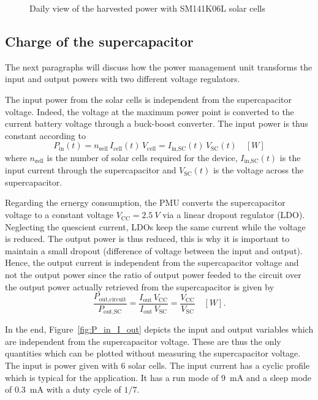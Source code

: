 \documentclass{EPL-master-thesis-covers-EN}
\newcommand{\te}[1]{\textrm{#1}}
\begin{document}
\begin{figure}[H]
    \centering
    
    \caption{Daily view of the harvested power with SM141K06L solar cells}
    \label{fig:P_cell}
\end{figure}

\subsection*{Charge of the supercapacitor}

The next paragraphs will discuss how the power management unit transforms the input and output powers with two different voltage regulators.

The input power from the solar cells is independent from the supercapacitor voltage. Indeed, the voltage at the maximum power point is converted to the current battery voltage through a buck-boost converter. The input power is thus constant according to
\[
 P_\te{in}(t) = n_\te{¢ell} \, I_\te{cell}(t)\,V_\te{cell} = I_\te{in,SC}(t) \, V_\te{SC}(t) \quad [\si{W}]
\]
where $n_\te{¢ell}$ is the number of solar cells required for the device, $I_\te{in,SC}(t)$ is the input current through the supercapacitor and $V_\te{SC}(t)$ is the voltage across the supercapacitor.

Regarding the ernergy consumption, the PMU converts the supercapacitor voltage to a constant voltage $V_\te{CC}= \SI{2.5}{V}$ via a linear dropout regulator (LDO). Neglecting the quescient current, LDOs keep the same current while the voltage is reduced. The output power is thus reduced, this is why it is important to maintain a small dropout (difference of voltage between the input and output). Hence, the output current is independent from the supercapacitor voltage and not the output power since the ratio of output power feeded to the circuit over the output power actually retrieved from the supercapacitor is given by
\[
 \frac{P_\te{out,circuit}}{P_\te{out,SC}} = \frac{I_\te{out} \, V_\te{CC}}{I_\te{out} \, V_\te{SC}} = \frac{V_\te{CC}}{V_\te{SC}} \quad [\si{W}].
\]

In the end, Figure~\ref{fig:P_in_I_out} depicts the input and output variables which are independent from the supercapacitor voltage. These are thus the only quantities which can be plotted without measuring the supercapacitor voltage. The input is power given with 6 solar cells. The input current has a cyclic profile which is typical for the application. It has a run mode of \SI{9}{mA} and a sleep mode of \SI{0.3}{mA} with a duty cycle of $1/7$.
\end{document}

